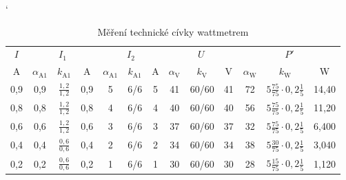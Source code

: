 \documentclass[a4paper, czech]{article}
\begin{document}
\begin{table}[H]
    \catcode`
    \centering
    \caption{Měření technické cívky wattmetrem}
    \renewcommand{\arraystretch}{1.25}
    \begin{tabular}{ccccccccccccc}
        \toprule
        $I$   & \multicolumn{3}{c}{$I_1$} & \multicolumn{3}{c}{$I_2$} & \multicolumn{3}{c}{$U$} & \multicolumn{3}{c}{$P'$}           \\
        \cmidrule(rl){1-1}
        \cmidrule(rl){2-4}
        \cmidrule(rl){5-7}
        \cmidrule(rl){8-10}
        \cmidrule(rl){11-13}
        A   & $\alpha_\text{A1}$  & $k_\text{A1}$      & A    & $\alpha_\text{A1}$  & $k_\text{A1}$    & A    & $\alpha_\text{V}$  & $k_\text{V}$      & V    & $\alpha_\text{W}$  & $k_\text{W}$                  & W     \\
        \midrule
        0,9 & 0,9  & $\frac{1,2}{1,2}$  & 0,9  & 5      & 6/6    & 5    & 41   & 60/60   & 41   & 72 & $5 \frac{75}{75} \cdot 0,2 \frac{1}{5}$ & 14,40 \\
        0,8 & 0,8  & $\frac{1,2}{1,2}$  & 0,8  & 4      & 6/6    & 4    & 40   & 60/60   & 40   & 56 & $5 \frac{75}{75} \cdot 0,2 \frac{1}{5}$ & 11,20 \\
        0,6 & 0,6  & $\frac{1,2}{1,2}$  & 0,6  & 3      & 6/6    & 3    & 37   & 60/60   & 37   & 32 & $5 \frac{75}{75} \cdot 0,2 \frac{1}{5}$ & 6,400 \\
        0,4 & 0,4  & $\frac{0,6}{0,6}$  & 0,4  & 2      & 6/6    & 2    & 34   & 60/60   & 34   & 38 & $5 \frac{30}{75} \cdot 0,2 \frac{1}{5}$ & 3,040 \\
        0,2 & 0,2  & $\frac{0,6}{0,6}$  & 0,2  & 1      & 6/6    & 1    & 30   & 60/60   & 30   & 28 & $5 \frac{15}{75} \cdot 0,2 \frac{1}{5}$ & 1,120 \\
        \bottomrule
    \end{tabular}
\end{table}
\end{document}
